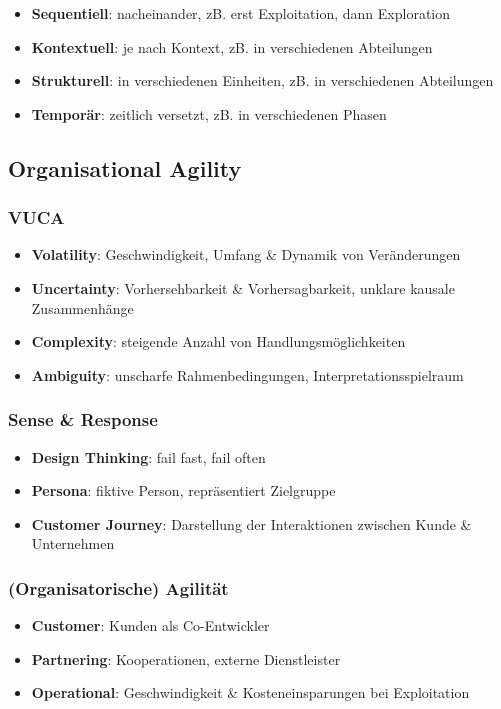 \documentclass{article}
\begin{document}
\begin{itemize}
  \item \textbf{Sequentiell}: nacheinander, zB. erst Exploitation, dann Exploration
  \item \textbf{Kontextuell}: je nach Kontext, zB. in verschiedenen Abteilungen
  \item \textbf{Strukturell}: in verschiedenen Einheiten, zB. in verschiedenen Abteilungen
  \item \textbf{Temporär}: zeitlich versetzt, zB. in verschiedenen Phasen
\end{itemize}

\subsection{Organisational Agility}

\subsubsection{VUCA}
\begin{itemize}
  \item \textbf{Volatility}: Geschwindigkeit, Umfang \& Dynamik von Veränderungen
  \item \textbf{Uncertainty}: Vorhersehbarkeit \& Vorhersagbarkeit, unklare kausale Zusammenhänge
  \item \textbf{Complexity}: steigende Anzahl von Handlungsmöglichkeiten
  \item \textbf{Ambiguity}: unscharfe Rahmenbedingungen, Interpretationsspielraum
\end{itemize}

\subsubsection{Sense \& Response}
\begin{itemize}
  \item \textbf{Design Thinking}: fail fast, fail often
  \item \textbf{Persona}: fiktive Person, repräsentiert Zielgruppe
  \item \textbf{Customer Journey}: Darstellung der Interaktionen zwischen Kunde \& Unternehmen
\end{itemize}

\subsubsection{(Organisatorische) Agilität}
\begin{itemize}
  \item \textbf{Customer}: Kunden als Co-Entwickler
  \item \textbf{Partnering}: Kooperationen, externe Dienstleister
  \item \textbf{Operational}: Geschwindigkeit \& Kosteneinsparungen bei Exploitation
\end{itemize}
\end{document}
